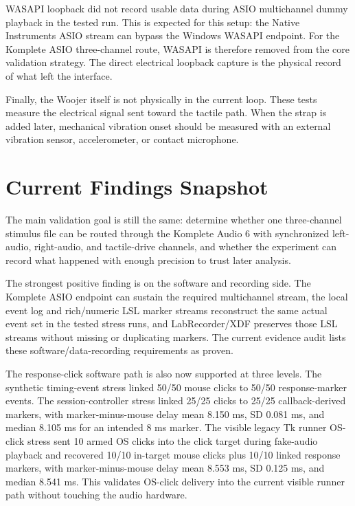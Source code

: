 \documentclass[11pt]{article}
\begin{document}
WASAPI loopback did not record usable data during ASIO multichannel dummy
playback in the tested run. This is expected for this setup: the Native
Instruments ASIO stream can bypass the Windows WASAPI endpoint. For the
Komplete ASIO three-channel route, WASAPI is therefore removed from the core
validation strategy. The direct electrical loopback capture is the physical
record of what left the interface.

Finally, the Woojer itself is not physically in the current loop. These tests
measure the electrical signal sent toward the tactile path. When the strap is
added later, mechanical vibration onset should be measured with an external
vibration sensor, accelerometer, or contact microphone.

\section{Current Findings Snapshot}

The main validation goal is still the same: determine whether one three-channel
stimulus file can be routed through the Komplete Audio 6 with synchronized
left-audio, right-audio, and tactile-drive channels, and whether the experiment
can record what happened with enough precision to trust later analysis.

The strongest positive finding is on the software and recording side. The
Komplete ASIO endpoint can sustain the required multichannel stream, the local
event log and rich/numeric LSL marker streams reconstruct the same actual event
set in the tested stress runs, and LabRecorder/XDF preserves those LSL streams
without missing or duplicating markers. The current evidence audit lists these
software/data-recording requirements as proven.

The response-click software path is also now supported at three levels. The
synthetic timing-event stress linked 50/50 mouse clicks to 50/50 response-marker
events. The session-controller stress linked 25/25 clicks to 25/25
callback-derived markers, with marker-minus-mouse delay mean 8.150 ms, SD 0.081
ms, and median 8.105 ms for an intended 8 ms marker. The visible legacy Tk
runner OS-click stress sent 10 armed OS clicks into the click target during
fake-audio playback and recovered 10/10 in-target mouse clicks plus 10/10
linked response markers, with marker-minus-mouse delay mean 8.553 ms, SD 0.125
ms, and median 8.541 ms. This validates OS-click delivery into the current
visible runner path without touching the audio hardware.
\end{document}
